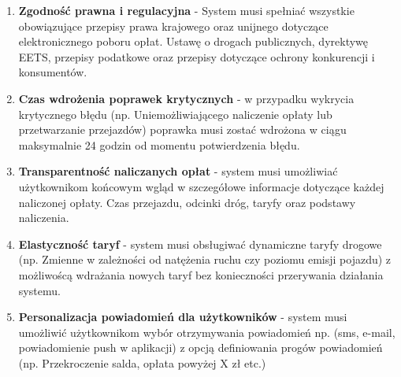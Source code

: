 \begin{enumerate}
    \item \textbf{Zgodność prawna i regulacyjna} - System musi spełniać wszystkie obowiązujące przepisy prawa krajowego oraz unijnego dotyczące elektronicznego poboru opłat. Ustawę o drogach publicznych, dyrektywę EETS, przepisy podatkowe oraz przepisy dotyczące ochrony konkurencji i konsumentów.

    \item \textbf{Czas wdrożenia poprawek krytycznych} - w przypadku wykrycia krytycznego błędu (np. Uniemożliwiającego naliczenie opłaty lub przetwarzanie przejazdów) poprawka musi zostać wdrożona w ciągu maksymalnie 24 godzin od momentu potwierdzenia błędu.

    \item \textbf{Transparentność naliczanych opłat} - system musi umożliwiać użytkownikom końcowym wgląd w szczegółowe informacje dotyczące każdej naliczonej opłaty. Czas przejazdu, odcinki dróg, taryfy oraz podstawy naliczenia.

    \item \textbf{Elastyczność taryf} - system musi obsługiwać dynamiczne taryfy drogowe (np. Zmienne w zależności od natężenia ruchu czy poziomu emisji pojazdu) z możliwoścą wdrażania nowych taryf bez konieczności przerywania działania systemu.

    \item \textbf{Personalizacja powiadomień dla użytkowników} - system musi umożliwić użytkownikom wybór otrzymywania powiadomień np. (sms, e-mail, powiadomienie push w aplikacji) z opcją definiowania progów powiadomień (np. Przekroczenie salda, opłata powyżej X zł etc.)
\end{enumerate}


